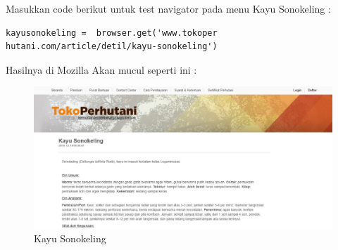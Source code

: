 Masukkan code berikut untuk test navigator pada menu Kayu Sonokeling :
\begin{verbatim}
kayusonokeling =  browser.get('www.tokoper
hutani.com/article/detil/kayu-sonokeling')
\end{verbatim}

Hasilnya  di Mozilla Akan mucul seperti ini :
\begin{figure}[h]
	\centering
	\includegraphics[scale=0.25]{figures/j3}
	\caption{Kayu Sonokeling}
\end{figure}

